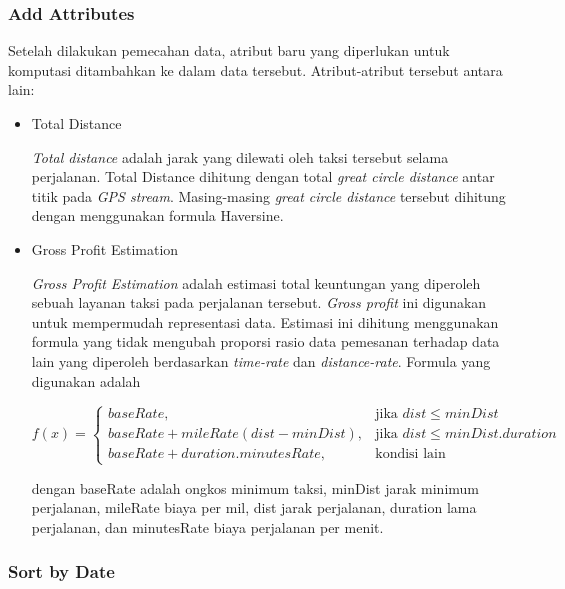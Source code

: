 \documentclass{article}
\begin{document}
\subsubsection{Add Attributes}

\begin{adjustwidth}{4em}{0pt}
	
	\hspace{\parindent}Setelah dilakukan pemecahan data, atribut baru yang diperlukan untuk komputasi ditambahkan ke dalam data tersebut. Atribut-atribut tersebut antara lain:
	
	\begin{itemize}
		\item{Total Distance}
		
		\textit{Total distance} adalah jarak yang dilewati oleh taksi tersebut selama perjalanan. Total Distance dihitung dengan total \textit{great circle distance} antar titik pada \textit{GPS stream}. Masing-masing \textit{great circle distance} tersebut dihitung dengan menggunakan formula Haversine.
		
		\item{Gross Profit Estimation}
		
		\textit{Gross Profit Estimation} adalah estimasi  total keuntungan  yang diperoleh sebuah layanan taksi pada perjalanan tersebut. \textit{Gross profit} ini digunakan untuk mempermudah representasi data. Estimasi ini dihitung menggunakan formula yang tidak mengubah proporsi rasio data pemesanan terhadap data lain yang diperoleh berdasarkan \textit{time-rate} dan \textit{distance-rate}. Formula yang digunakan adalah
		
		\[
		f(x) = 
		\begin{cases}
		baseRate,& \text{jika } dist \leq minDist \\
		baseRate+mileRate(dist-minDist),& \text{jika } dist \le minDist.duration \\
		baseRate+duration.minutesRate, & \text{kondisi lain}
		\end{cases}
		\]
		
		dengan baseRate adalah ongkos minimum taksi, minDist jarak minimum perjalanan, mileRate biaya per mil, dist jarak perjalanan, duration lama perjalanan, dan minutesRate biaya perjalanan per menit.
		
	\end{itemize}
	
	
\end{adjustwidth}

\subsubsection{Sort by Date}
\end{document}
